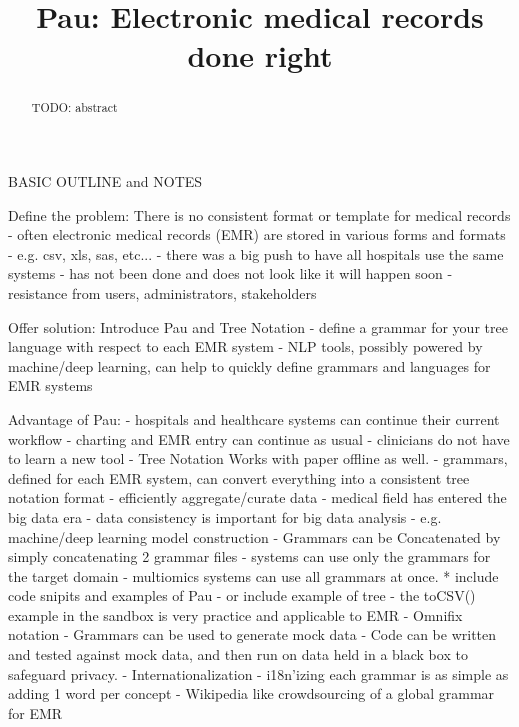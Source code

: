 \documentclass[journal]{IEEEtran}
\begin{document}
\title{Pau: Electronic medical records done right}

\iffalse
\author{
  Lambert Leong \\
  University of Hawaii \\
  {\underline{lambert3@hawaii.edu}} \\
\and
  Xun Zhu \\
  University of Hawaii \\
  {\underline{zhu2@hawaii.edu}} \\
\and
  Breck Yunits\\
  University of Hawaii Cancer Center\\
  {\underline{breckuh@gmail.com}}\\ }
\fi


\date{}

\maketitle
\begin{abstract}
	TODO: abstract
\end{abstract}

\iffalse
BASIC OUTLINE and NOTES

Define the problem: There is no consistent format or template for medical records
	- often electronic medical records (EMR) are stored in various forms and
	  formats
		- e.g. csv, xls, sas, etc...
	- there was a big push to have all hospitals use the same systems
		- has not been done and does not look like it will happen soon
		- resistance from users, administrators, stakeholders

Offer solution: Introduce Pau and Tree Notation
	- define a grammar for your tree language with respect to each EMR system
	- NLP tools, possibly powered by machine/deep learning, can help to
	  quickly define grammars and languages for EMR systems

Advantage of Pau:
	- hospitals and healthcare systems can continue their current workflow
		- charting and EMR entry can continue as usual 
		- clinicians do not have to learn a new tool
    - Tree Notation Works with paper offline as well.
	- grammars, defined for each EMR system, can convert everything into a
	  consistent tree notation format
		- efficiently aggregate/curate data 
		- medical field has entered the big data era
			- data consistency is important for big data analysis
				- e.g. machine/deep learning model construction
    - Grammars can be Concatenated by simply concatenating 2 grammar files
     - systems can use only the grammars for the target domain
     - multiomics systems can use all grammars at once.
	* include code snipits and examples of Pau
		- or include example of tree
			- the toCSV() example in the sandbox is very practice
			  and applicable to EMR
  - Omnifix notation
  - Grammars can be used to generate mock data
   - Code can be written and tested against mock data, and then run on data held in a black box to safeguard privacy.
  - Internationalization
   - i18n'izing each grammar is as simple as adding 1 word per concept
  - Wikipedia like crowdsourcing of a global grammar for EMR
\end{document}

